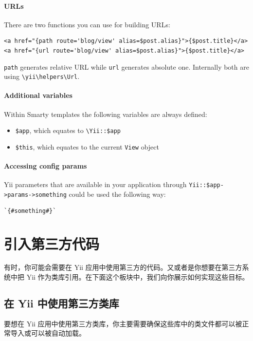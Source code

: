 \paragraph{URLs}
There are two functions you can use for building URLs:

\lstset{language=php}\begin{lstlisting}
<a href="{path route='blog/view' alias=$post.alias}">{$post.title}</a>
<a href="{url route='blog/view' alias=$post.alias}">{$post.title}</a>
\end{lstlisting}
\lstinline|path| generates relative URL while \lstinline|url| generates absolute one. Internally both are using \texttt{{\allowbreak{}\textbackslash}yii{\allowbreak{}\textbackslash}helpers{\allowbreak{}\textbackslash}Url}.

\paragraph{Additional variables}
Within Smarty templates the following variables are always defined:

\begin{itemize}
\item \lstinline|$app|, which equates to \lstinline|\Yii::$app|
\item \lstinline|$this|, which equates to the current \lstinline|View| object
\end{itemize}
\paragraph{Accessing config params}
Yii parameters that are available in your application through \lstinline|Yii::$app->params->something| could be used the following
way:

\begin{lstlisting}
`{#something#}`
\end{lstlisting}


\label{tutorial-yii-integration.md}\section{引入第三方代码}
有时，你可能会需要在 Yii 应用中使用第三方的代码。又或者是你想要在第三方系统中把 Yii 作为类库引用。在下面这个板块中，我们向你展示如何实现这些目标。

\subsection{在 Yii 中使用第三方类库 \label{tutorial-yii-integration.md::using-libs-in-yii}}
要想在 Yii 应用中使用第三方类库，你主要需要确保这些库中的类文件都可以被正常导入或可以被自动加载。

